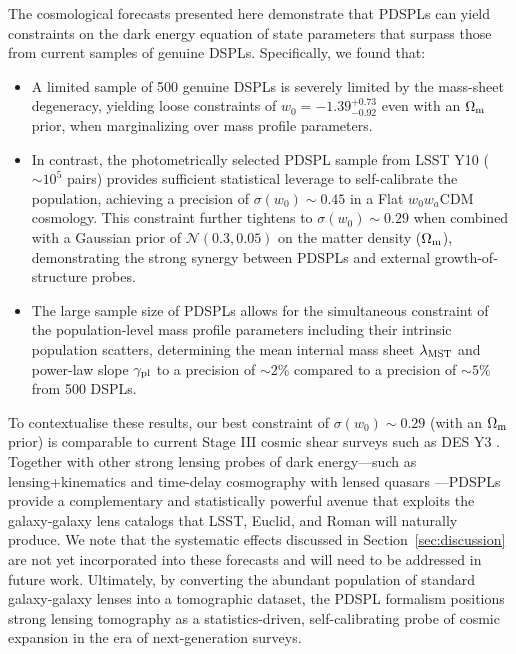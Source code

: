 \documentclass[a4paper,11pt]{article}
\begin{document}
The cosmological forecasts presented here demonstrate that PDSPLs can yield constraints on the dark energy equation of state parameters that surpass those from current samples of genuine DSPLs. Specifically, we found that:
\begin{itemize}
    \item A limited sample of 500 genuine DSPLs is severely limited by the mass-sheet degeneracy, yielding loose constraints of $w_0 = -1.39^{+0.73}_{-0.92}$ even with an $\Omega_{\rm m}$ prior, when marginalizing over mass profile parameters.
    \item In contrast, the photometrically selected PDSPL sample from LSST Y10 ($\sim 10^5$ pairs) provides sufficient statistical leverage to self-calibrate the population, achieving a precision of $\sigma(w_0) \sim 0.45$ in a Flat $w_0w_a$CDM cosmology. This constraint further tightens to $\sigma(w_0) \sim 0.29$ when combined with a Gaussian prior of $\mathcal{N}(0.3, 0.05)$ on the matter density ($\Omega_{\rm m}$), demonstrating the strong synergy between PDSPLs and external growth-of-structure probes.
    \item The large sample size of PDSPLs allows for the simultaneous constraint of the population-level mass profile parameters including their intrinsic population scatters, determining the mean internal mass sheet $\lambda_{\rm MST}$ and power-law slope $\gamma_{\rm pl}$ to a precision of $\sim 2\%$ compared to a precision of $\sim 5\%$ from 500 DSPLs.
\end{itemize}

To contextualise these results, our best constraint of $\sigma(w_0) \sim 0.29$ (with an $\Omega_{\rm m}$ prior) is comparable to current Stage III cosmic shear surveys such as DES Y3 \citep{DES_Y3:2022}. Together with other strong lensing probes of dark energy—such as lensing+kinematics \citep{Li:2024} and time-delay cosmography with lensed quasars \citep{Erickson:2025}—PDSPLs provide a complementary and statistically powerful avenue that exploits the galaxy-galaxy lens catalogs that LSST, Euclid, and Roman will naturally produce. We note that the systematic effects discussed in Section~\ref{sec:discussion} are not yet incorporated into these forecasts and will need to be addressed in future work. Ultimately, by converting the abundant population of standard galaxy-galaxy lenses into a tomographic dataset, the PDSPL formalism positions strong lensing tomography as a statistics-driven, self-calibrating probe of cosmic expansion in the era of next-generation surveys.
\end{document}
